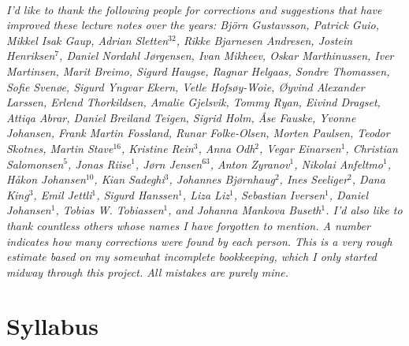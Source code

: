 \documentclass{tufte-book}
\begin{document}
\cleardoublepage
~\vfill
\begin{doublespace}
\noindent\fontsize{10}{10}\selectfont\itshape
\nohyphenation
I'd like to thank the following people for corrections and suggestions
that have improved these lecture notes over the years: Björn
Gustavsson, Patrick Guio,
Mikkel Isak Gaup, Adrian Sletten$^{32}$,
Rikke Bjarnesen Andresen, Jostein Henriksen$^7$, Daniel Nordahl Jørgensen,
Ivan Mikheev, Oskar Marthinussen, Iver Martinsen, Marit Breimo, Sigurd
Haugse, Ragnar Helgaas, Sondre Thomassen, Sofie Svenøe, Sigurd Yngvar
Ekern, Vetle Hofsøy-Woie, Øyvind Alexander Larssen, Erlend
Thorkildsen, Amalie Gjelsvik, Tommy Ryan, Eivind Dragset, Attiqa
Abrar, Daniel Breiland Teigen, Sigrid Holm, Åse Fauske, Yvonne
Johansen, Frank Martin Fossland, Runar Folke-Olsen, Morten Paulsen,
Teodor Skotnes,
Martin Stave$^{16}$, Kristine Rein$^{3}$, Anna Odh$^{2}$, Vegar
Einarsen$^{1}$, Christian Salomonsen$^{5}$, Jonas Riise$^{1}$, Jørn
Jensen$^{63}$, Anton Zyranov$^{1}$, Nikolai Anfeltmo$^{1}$, Håkon
Johansen$^{10}$, Kian Sadeghi$^{3}$, Johannes Bjørnhaug$^{2}$, Ines
Seeliger$^{2}$, Dana King$^{3}$, Emil Jettli$^{1}$, Sigurd
Hanssen$^{1}$, Liza Liz$^{1}$, Sebastian Iversen$^{1}$, Daniel
Johansen$^{1}$, Tobias W. Tobiassen$^{1}$, and Johanna Mankova
Buseth$^{1}$. I'd also like to thank countless others whose names I
have forgotten to mention. A number indicates how many corrections were
found by each person. This is a very rough estimate based on my
somewhat incomplete bookkeeping, which I only started midway through
this project. All mistakes are purely mine.
\end{doublespace}
\vfill
\vfill





\cleardoublepage

\mainmatter
\ifSpSyllabus
\chapter{Syllabus} 

\fi
\end{document}
